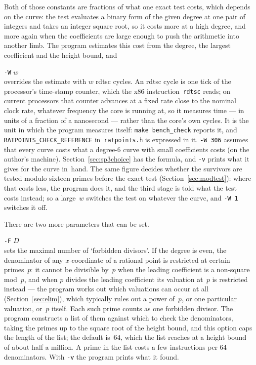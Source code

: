 \documentclass[12pt,a4paper,oneside]{amsart}
\begin{document}
Both of those constants are fractions of what one exact test costs, which
depends on the curve: the test evaluates a binary form of
the given degree at one pair of integers and takes an integer square root, so
it costs more at a high degree, and more again when the coefficients are
large enough to push the arithmetic into another limb. The program estimates
this cost from the degree, the largest coefficient and the height bound, and \\
\strut\quad\verb+-W+ $w$ \\
overrides the estimate with $w$ rdtsc cycles. An rdtsc cycle is one tick of
the processor's time-stamp counter, which the x86 instruction~\texttt{rdtsc}
reads; on current processors that counter advances at a fixed rate close to
the nominal clock rate, whatever frequency the core is running at, so it
measures time --- in units of a fraction of a nanosecond --- rather than the
core's own cycles. It is the unit in which the program measures itself:
\texttt{make bench\_check} reports it, and
\texttt{RATPOINTS\_CHECK\_REFERENCE} in~\texttt{ratpoints.h} is expressed
in it. \verb+-W 306+ assumes that every curve costs what a degree-6 curve
with small coefficients costs (on the author's machine).
Section~\ref{sec:sp3choice} has the formula, and \verb+-v+ prints
what it gives for the curve in~hand. The same figure decides whether the
survivors are tested modulo sixteen primes before the exact test
(Section~\ref{sec:modtest}): where that costs less, the program does it,
and the third stage is told what the test costs instead; so a large~$w$
switches the test on whatever the curve, and \verb+-W 1+ switches it off.

There are two more parameters that can be set. \\
\strut\quad\verb+-F+ $D$ \\
sets the maximal number of `forbidden divisors'. If the degree is even,
the denominator of any $x$-coordinate of a rational point is restricted at
certain primes~$p$: it cannot be divisible by~$p$ when the leading
coefficient is a non-square mod~$p$, and when $p$ divides the leading
coefficient its valuation at~$p$ is restricted instead --- the program
works out which valuations can occur at all (Section~\ref{sec:elim}), which
typically rules out a power of~$p$, or one particular valuation, or~$p$
itself. Each such prime counts as one forbidden divisor. The program
constructs a list of them against which to check the denominators, taking
the primes up to the square root of the height bound, and this option caps
the length of the list; the default is~$64$, which the list reaches at a
height bound of about half a million. A prime in the list costs a few
instructions per 64 denominators. With \verb+-v+ the program prints what it found.
\end{document}
